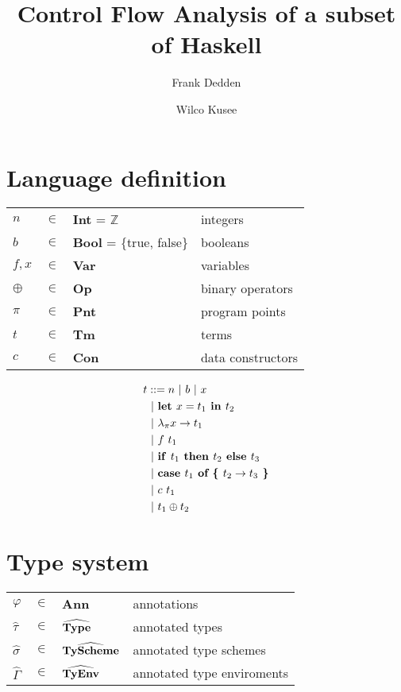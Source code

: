 \documentclass[10pt]{article}
\title{Control Flow Analysis of a subset of Haskell}
\author{Frank Dedden \and Wilco Kusee}
\newcommand{\keyw}[1]{\textrm{\textbf{#1}}}
\newcommand{\GammaH}{\widehat{\Gamma}}
\newcommand{\tauH}{\widehat{\tau}}
\newcommand{\sigmaH}{\widehat{\sigma}}
\newcommand{\letin}[2]{\keyw{let~} #1 \keyw{~in~} #2}
\newcommand{\lam}[2]{\keyw{$\lambda_\pi$} #1 \rightarrow #2}
\newcommand{\ite}[3]{\keyw{if~} #1 \keyw{~then~} #2 \keyw{~else~} #3}
\newcommand{\case}[3]{\keyw{case~} #1 \keyw{~of \{~} #2 \rightarrow #3 \keyw{~\}}}
\newcommand{\app}[2]{#1 ~ #2}
\newcommand{\con}[2]{#1 ~ #2}
\newcommand{\infix}[2]{#1 \oplus #2}
\begin{document}
\maketitle

\section{Language definition}
\begin{table}[htp]
	\centering
	\begin{tabular}{llll}
		$n$     & $\in$     & \textbf{Int} = $\mathbb{Z}$         & integers\\
		$b$     & $\in$     & \textbf{Bool} = \{true, false\}   & booleans\\
		$f,x$   & $\in$     & \textbf{Var}                      & variables\\
		$\oplus$ & $\in$     & \textbf{Op}                       & binary operators\\
		$\pi$   & $\in$     & \textbf{Pnt}                      & program points\\
		$t$     & $\in$     & \textbf{Tm}                       & terms\\
		$c$     & $\in$     & \textbf{Con}                   & data constructors\\
	\end{tabular}
\end{table}

\begin{align*}
	t   & ::= n ~|~ b ~|~ x\\
		& ~|~ \letin{x = t_1}{t_2}\\
		& ~|~ \lam{x}{t_1}\\
		& ~|~ \app{f}{t_1}\\
		& ~|~ \ite{t_1}{t_2}{t_3}\\
		& ~|~ \case{t_1}{t_2}{t_3}\\
		& ~|~ \con{c}{t_1}\\
		& ~|~ \infix{t_1}{t_2}\\
\end{align*}


\section{Type system}
\begin{table}[htp]
	\centering
	\begin{tabular}{llll}
		$\varphi$ & $\in$   & \textbf{Ann}                           & annotations\\
		$\tauH$   & $\in$   & $\widehat{\textrm{\textbf{Type}}}$     & annotated types\\
		$\sigmaH$ & $\in$   & $\widehat{\textrm{\textbf{TyScheme}}}$ & annotated type schemes\\
		$\GammaH$ & $\in$   & $\widehat{\textrm{\textbf{TyEnv}}}$    & annotated type enviroments\\
	\end{tabular}
\end{table}
\end{document}
